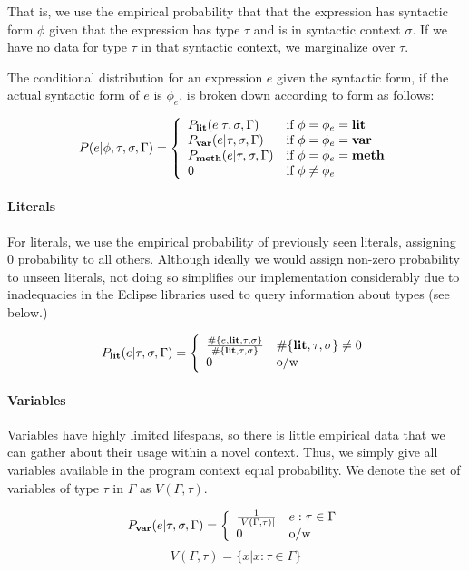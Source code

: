 \documentclass{article} %
\begin{document}
  That is, we use the empirical probability that that the expression has syntactic form $\phi$ given that the expression has type $\tau$ and is in syntactic context $\sigma$. If we have no data for type $\tau$ in that syntactic context, we marginalize over $\tau$.
  
  The conditional distribution for an expression $e$ given the syntactic form, if the actual syntactic form of $e$ is $\phi_e$, is broken down according to form as follows:
  
$$P(e | \phi, \tau, \sigma, \Gamma) =
\left\{
	\begin{array}{ll}
		P_{\textbf{lit}}(e | \tau, \sigma, \Gamma) & \mbox{if } \phi = \phi_e = \textbf{lit}\\
		P_{\textbf{var}}(e | \tau, \sigma, \Gamma) & \mbox{if } \phi = \phi_e = \textbf{var}\\
		P_{\textbf{meth}}(e | \tau, \sigma, \Gamma) & \mbox{if } \phi = \phi_e = \textbf{meth}\\
		0  & \mbox{if } \phi \neq \phi_e 
	\end{array}
\right.
$$
\paragraph{Literals}
For literals, we use the empirical probability of previously seen literals, assigning 0 probability to all others. Although ideally we would assign non-zero probability to unseen literals, not doing so simplifies our implementation considerably due to inadequacies in the Eclipse libraries used to query information about types (see below.)

$$P_{\textbf{lit}}(e | \tau, \sigma, \Gamma) = 
\left\{
	\begin{array}{ll}
		\frac{\#\{e, \textbf{lit}, \tau, \sigma\}}{\#\{\textbf{lit}, \tau, \sigma\}} & \#\{\textbf{lit}, \tau, \sigma\} \neq 0\\
		0 & \mbox{o/w}
	\end{array}
\right.$$

\paragraph{Variables} Variables have highly limited lifespans, so there is little empirical data that we can gather about their usage within a novel context. Thus, we simply give all variables available in the program context equal probability. We denote the set of variables of type $\tau$ in $\Gamma$ as $V(\Gamma, \tau)$.

$$P_{\textbf{var}}(e | \tau, \sigma, \Gamma) = 
\left\{
	\begin{array}{ll}
	\frac{1}{|V(\Gamma, \tau)|} & e : \tau \in \Gamma\\
	0 & \mbox{o/w}
	\end{array}
\right.$$
$$V(\Gamma, \tau) = \{ x | x : \tau \in \Gamma\}$$
\end{document}
